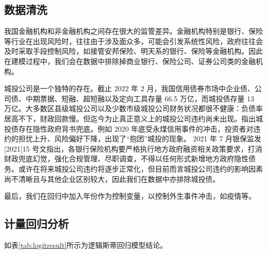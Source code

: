 \subsection{数据清洗}

我国金融机构和非金融机构之间存在很大的监管差异。金融机构特别是银行、保险等行业在出现风险时，往往由于涉及面众多，可能会引发系统性风险，政府往往会及时采取手段控制风险，如接管安邦保险、明天系的银行、保险等金融机构。因此在建模过程中，我们会在数据中排除掉商业银行、保险公司、证券公司类的金融机构。

城投公司是一个独特的存在。截止 2022 年 2 月，我国信用债券市场中企业债、公司债、中期票据、短融、超短融以及定向工具存量 66.5  万亿，而城投债存量 13 万亿。大多数区县级城投公司以及少数市级城投公司财务状况都很不健康：负债率居高不下，财政回款慢。但迄今为止真正意义上的城投公司违约尚未出现。\Textcite{钟辉勇2016城投债的担保可信吗}指出城投债存在隐性政府背书兜底。例如 2020 年底受永煤信用事件的冲击，投资者对违约的担忧上升、风险偏好下降，出现了“抱团”城投的现象。
2021 年 7 月银保监发 [2021]15 号文指出，各银行保险机构要严格执行地方政府融资相关政策要求，打消财政兜底幻觉，强化合规管理、尽职调查，不得以任何形式新增地方政府隐性债务。或许在将来城投公司违约将逐步正常化，但目前而言城投公司违约的影响因素尚不清晰且与其他企业区别较大，因此我们在数据中亦排除城投债。

最后，我们在回归中加入年份作为控制变量，以控制外生事件冲击，如疫情等。

\subsection{计量回归分析}
如表\ref{tab:logitresult}所示为逻辑斯蒂回归模型结论。

